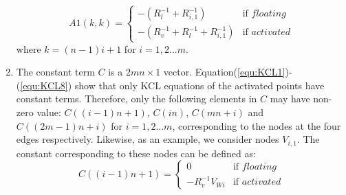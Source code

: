 \begin{enumerate}
    \begin{equation}
    A1(k,k) = \left\{
    \begin{array}{ll}
    -(R_l^{-1}+R_{i,1}^{-1})   & \text{if } floating\\
    -(R_v^{-1}+R_l^{-1}+R_{i,1}^{-1})& \text{if } activated
    \end{array} \right.
    \end{equation}
    where $k=(n-1)i+1$ for $i=1,2...m$.

\item The constant term $C$ is a $2mn{\times}1$ vector.
    Equation(\ref{equ:KCL1})-(\ref{equ:KCL8}) show that only KCL
    equations of the activated points have constant terms. Therefore,
    only the following elements in $C$ may have non-zero value:
    $C((i-1)n+1)$, $C(in)$, $C(mn+i)$ and $C((2m-1)n+i)$ for
    $i=1,2...m$, corresponding to the nodes at the four edges
    respectively. Likewise, as an example, we consider nodes
    $V_{i,1}$. The constant corresponding to these nodes can be
    defined as:
    \begin{equation}
    C((i-1)n+1) = \left\{
    \begin{array}{ll}
    0   & \text{if } floating\\
    -R_v^{-1}V_{Wi}& \text{if } activated
    \end{array} \right.
    \end{equation}
\end{enumerate}
